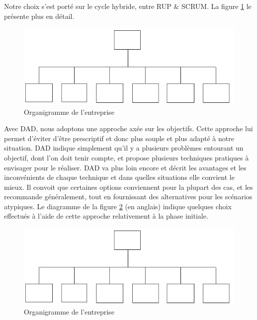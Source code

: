 \begin{spacing}{1.5}
Notre choix s'est porté sur le cycle hybride, entre RUP \& SCRUM. La figure \ref{fig:rup_scrum_dad} le présente plus en détail.
\begin{figure}[h]
\centering
\includegraphics[width=0.8\linewidth]{organigramme.jpg}
\caption{Organigramme de l'entreprise}
\label{fig:rup_scrum_dad}
\end{figure}

Avec DAD, nous adoptons une approche axée sur les objectifs. Cette approche lui permet d'éviter d'être prescriptif et donc plus souple et plus adapté à notre situation. DAD indique simplement qu'il y a plusieurs problèmes entourant un objectif, dont l'on doit tenir compte, et propose plusieurs techniques pratiques à envisager pour le réaliser. DAD va plus loin encore et décrit les avantages et les inconvénients de chaque technique et dans quelles situations elle convient le mieux. Il convoit que certaines options conviennent pour la plupart des cas, et les recommande généralement, tout en fournissant des alternatives pour les scénarios atypiques. Le diagramme de la figure \ref{fig:initialGoal} (en anglais) indique quelques choix effectués à l'aide de cette approche relativement à la phase initiale.

\begin{figure}[h]
\centering
\includegraphics[width=0.8\linewidth]{organigramme.jpg}
\caption{Organigramme de l'entreprise}
\label{fig:initialGoal}
\end{figure}


\end{spacing}
